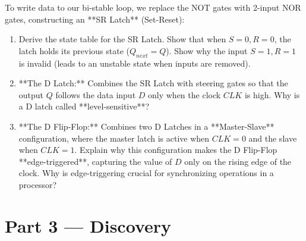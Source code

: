 \documentclass[12pt, a4paper]{book}
\begin{document}
\begin{explobox}
To write data to our bi-stable loop, we replace the NOT gates with 2-input NOR gates, constructing an **SR Latch** (Set-Reset):
\begin{center}
\end{center}
\begin{enumerate}[label=(\alph*), leftmargin=*]
  \item Derive the state table for the SR Latch. Show that when $S=0, R=0$, the latch holds its previous state ($Q_{next} = Q$). Show why the input $S=1, R=1$ is invalid (leads to an unstable state when inputs are removed).
  \item **The D Latch:** Combines the SR Latch with steering gates so that the output $Q$ follows the data input $D$ only when the clock $CLK$ is high. Why is a D latch called **level-sensitive**?
  \item **The D Flip-Flop:** Combines two D Latches in a **Master-Slave** configuration, where the master latch is active when $CLK=0$ and the slave when $CLK=1$.
        Explain why this configuration makes the D Flip-Flop **edge-triggered**, capturing the value of $D$ only on the rising edge of the clock. Why is edge-triggering crucial for synchronizing operations in a processor?
\end{enumerate}
\end{explobox}

\newpage

\section{Part 3 --- Discovery}
\end{document}
